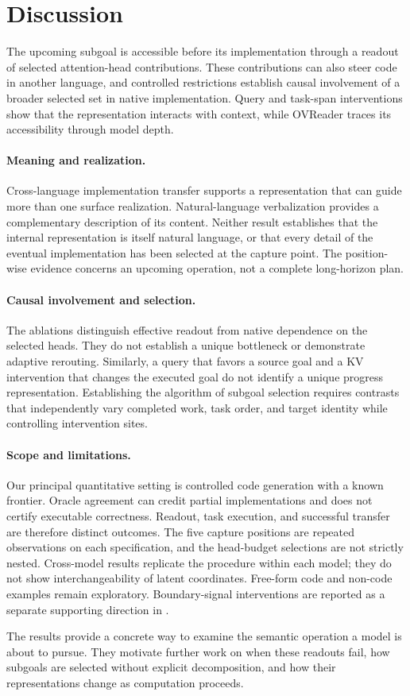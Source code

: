 \section{Discussion}
\label{sec:conclusion}
The upcoming subgoal is accessible before its implementation through a readout of selected attention-head contributions. These contributions can also steer code in another language, and controlled restrictions establish causal involvement of a broader selected set in native implementation. Query and task-span interventions show that the representation interacts with context, while OVReader traces its accessibility through model depth.

\paragraph{Meaning and realization.}
Cross-language implementation transfer supports a representation that can guide more than one surface realization. Natural-language verbalization provides a complementary description of its content. Neither result establishes that the internal representation is itself natural language, or that every detail of the eventual implementation has been selected at the capture point. The position-wise evidence concerns an upcoming operation, not a complete long-horizon plan.

\paragraph{Causal involvement and selection.}
\label{sec:mechanism:competence}
The ablations distinguish effective readout from native dependence on the selected heads. They do not establish a unique bottleneck or demonstrate adaptive rerouting. Similarly, a query that favors a source goal and a KV intervention that changes the executed goal do not identify a unique progress representation. Establishing the algorithm of subgoal selection requires contrasts that independently vary completed work, task order, and target identity while controlling intervention sites.

\paragraph{Scope and limitations.}
Our principal quantitative setting is controlled code generation with a known frontier. Oracle agreement can credit partial implementations and does not certify executable correctness. Readout, task execution, and successful transfer are therefore distinct outcomes. The five capture positions are repeated observations on each specification, and the head-budget selections are not strictly nested. Cross-model results replicate the procedure within each model; they do not show interchangeability of latent coordinates. Free-form code and non-code examples remain exploratory. Boundary-signal interventions are reported as a separate supporting direction in .

The results provide a concrete way to examine the semantic operation a model is about to pursue. They motivate further work on when these readouts fail, how subgoals are selected without explicit decomposition, and how their representations change as computation proceeds.
